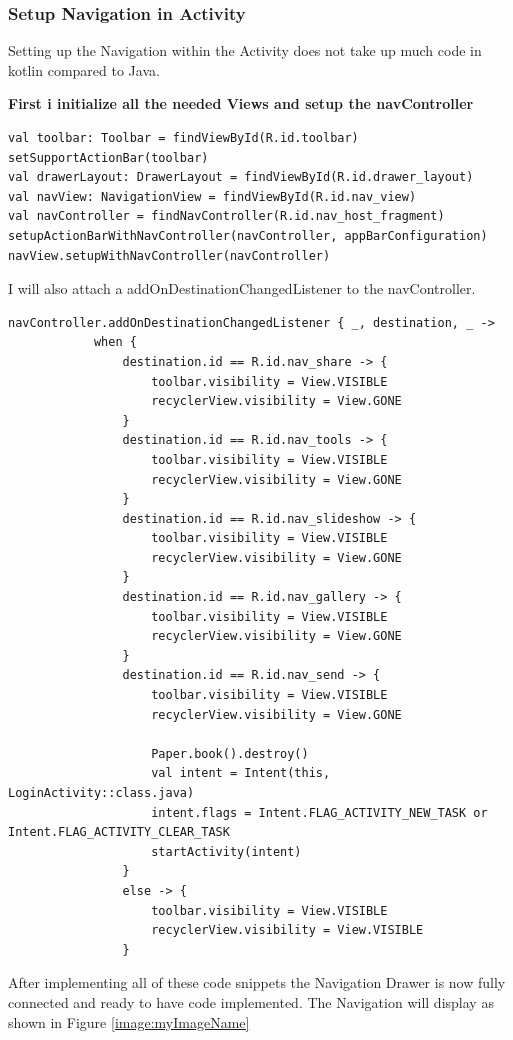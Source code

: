 \subsubsection{Setup Navigation in Activity}
Setting up the Navigation within the Activity does not take up much code in kotlin compared to Java.\newline

\textbf{First i initialize all the needed Views and setup the navController}

\begin{verbatim}
val toolbar: Toolbar = findViewById(R.id.toolbar)
setSupportActionBar(toolbar)
val drawerLayout: DrawerLayout = findViewById(R.id.drawer_layout)
val navView: NavigationView = findViewById(R.id.nav_view)
val navController = findNavController(R.id.nav_host_fragment)
setupActionBarWithNavController(navController, appBarConfiguration)
navView.setupWithNavController(navController)
\end{verbatim}

I will also attach a addOnDestinationChangedListener to the navController.

\begin{verbatim}
navController.addOnDestinationChangedListener { _, destination, _ ->
            when {
                destination.id == R.id.nav_share -> {
                    toolbar.visibility = View.VISIBLE
                    recyclerView.visibility = View.GONE
                }
                destination.id == R.id.nav_tools -> {
                    toolbar.visibility = View.VISIBLE
                    recyclerView.visibility = View.GONE
                }
                destination.id == R.id.nav_slideshow -> {
                    toolbar.visibility = View.VISIBLE
                    recyclerView.visibility = View.GONE
                }
                destination.id == R.id.nav_gallery -> {
                    toolbar.visibility = View.VISIBLE
                    recyclerView.visibility = View.GONE
                }
                destination.id == R.id.nav_send -> {
                    toolbar.visibility = View.VISIBLE
                    recyclerView.visibility = View.GONE
                    
                    Paper.book().destroy()
                    val intent = Intent(this, LoginActivity::class.java)
                    intent.flags = Intent.FLAG_ACTIVITY_NEW_TASK or Intent.FLAG_ACTIVITY_CLEAR_TASK
                    startActivity(intent)
                }
                else -> {
                    toolbar.visibility = View.VISIBLE
                    recyclerView.visibility = View.VISIBLE
                }
\end{verbatim}
After implementing all of these code snippets the Navigation Drawer is now fully connected and ready to have code implemented. The Navigation will display as shown in Figure \ref{image:myImageName}

